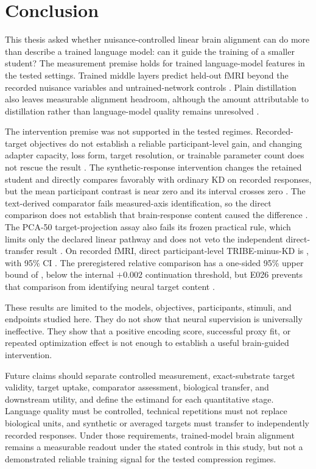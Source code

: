 \section{Conclusion}

This thesis asked whether nuisance-controlled linear brain alignment can do more than describe a trained language model: can it guide the training of a smaller student?
The measurement premise holds for trained language-model features in the tested settings.
Trained middle layers predict held-out fMRI beyond the recorded nuisance variables and untrained-network controls .
Plain distillation also leaves measurable alignment headroom, although the amount attributable to distillation rather than language-model quality remains unresolved .

The intervention premise was not supported in the tested regimes.
Recorded-target objectives do not establish a reliable participant-level gain, and changing adapter capacity, loss form, target resolution, or trainable parameter count does not rescue the result .
The synthetic-response intervention changes the retained student and directly compares favorably with ordinary KD on recorded responses, but the mean participant contrast is near zero and its interval crosses zero .
The text-derived comparator fails measured-axis identification, so the direct comparison does not establish that brain-response content caused the difference .
The PCA-50 target-projection assay also fails its frozen practical rule, which limits only the declared linear pathway and does not veto the independent direct-transfer result .
On recorded fMRI, direct participant-level TRIBE-minus-KD is , with 95\% CI .
The preregistered relative comparison has a one-sided 95\% upper bound of , below the internal $+0.002$ continuation threshold, but E026 prevents that comparison from identifying neural target content .

These results are limited to the models, objectives, participants, stimuli, and endpoints studied here.
They do not show that neural supervision is universally ineffective.
They show that a positive encoding score, successful proxy fit, or repeated optimization effect is not enough to establish a useful brain-guided intervention.

Future claims should separate controlled measurement, exact-substrate target validity, target uptake, comparator assessment, biological transfer, and downstream utility, and define the estimand for each quantitative stage.
Language quality must be controlled, technical repetitions must not replace biological units, and synthetic or averaged targets must transfer to independently recorded responses.
Under those requirements, trained-model brain alignment remains a measurable readout under the stated controls in this study, but not a demonstrated reliable training signal for the tested compression regimes.
